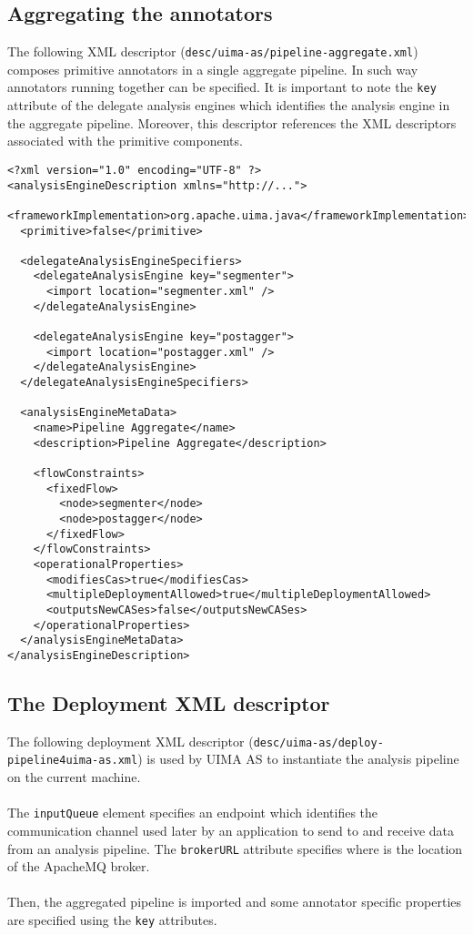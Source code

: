 \documentclass{wileysev}
\begin{document}
\subsection{Aggregating the annotators}

The following XML descriptor (\texttt{desc/uima-as/pipeline-aggregate.xml}) composes primitive annotators in a single aggregate pipeline. In such way annotators running together can be specified. It is important to note the \texttt{key} attribute of the delegate analysis engines which identifies the analysis engine in the aggregate pipeline. Moreover, this descriptor references the XML descriptors associated with the primitive components.

\lstset{language=XML}
\begin{lstlisting}
<?xml version="1.0" encoding="UTF-8" ?>
<analysisEngineDescription xmlns="http://...">
  <frameworkImplementation>org.apache.uima.java</frameworkImplementation>
  <primitive>false</primitive>

  <delegateAnalysisEngineSpecifiers>
    <delegateAnalysisEngine key="segmenter">
      <import location="segmenter.xml" />
    </delegateAnalysisEngine>

    <delegateAnalysisEngine key="postagger">
      <import location="postagger.xml" />
    </delegateAnalysisEngine>
  </delegateAnalysisEngineSpecifiers>

  <analysisEngineMetaData>
    <name>Pipeline Aggregate</name>
    <description>Pipeline Aggregate</description>
    
    <flowConstraints>
      <fixedFlow>
        <node>segmenter</node>
        <node>postagger</node>
      </fixedFlow>
    </flowConstraints>	
    <operationalProperties>
      <modifiesCas>true</modifiesCas>
      <multipleDeploymentAllowed>true</multipleDeploymentAllowed>
      <outputsNewCASes>false</outputsNewCASes>
    </operationalProperties>
  </analysisEngineMetaData>
</analysisEngineDescription>
\end{lstlisting}

\subsection{The Deployment XML descriptor}

The following deployment XML descriptor (\texttt{desc/uima-as/deploy-pipeline4uima-as.xml}) is used by UIMA AS to instantiate the analysis pipeline on the current machine.
\\\\
The \texttt{inputQueue} element specifies an endpoint which identifies the communication channel used later by an application to send to and receive data from an analysis pipeline. The \texttt{brokerURL} attribute specifies where is the location of the ApacheMQ broker.
\\\\
Then, the aggregated pipeline is imported and some annotator specific properties are specified using the \texttt{key} attributes.
\end{document}
